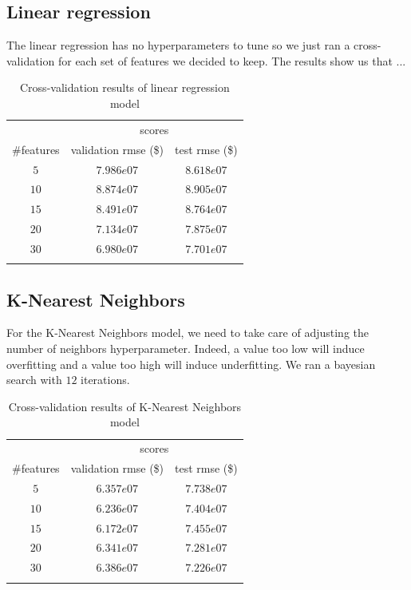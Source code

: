 \subsection{Linear regression}

The linear regression has no hyperparameters to tune so we just ran a cross-validation for each set of features we decided to keep. The results show us that ... 

\begin{table}[H]
	\centering
	\begin{tabular}{ccc} \toprule
	  & \multicolumn {2}{c}{scores} \\\cmidrule(lr) {2-3}
	  \#features         & validation rmse (\$)             & test rmse (\$) \\\hline
	  $5$        		& $7.986e07$                      	& $8.618e07$ \\
	  $10$        		& $8.874e07$                        & $8.905e07$ \\
	  $15$        		& $8.491e07$                        & $8.764e07$ \\
	  $20$             	& $7.134e07$                        & $7.875e07$ \\
	  $30$             	& $6.980e07$                        & $7.701e07$ \\
	  \\\hline
	\end{tabular}
	\caption{Cross-validation results of linear regression model}
	\label{tab:linear-regression-results}
\end{table}

\subsection{K-Nearest Neighbors}

For the K-Nearest Neighbors model, we need to take care of adjusting the number of neighbors hyperparameter. Indeed, a value too low will induce overfitting and a value too high will induce underfitting. We ran a bayesian search with $12$ iterations.

\begin{table}[H]
	\centering
	\begin{tabular}{ccc} \toprule
	  & \multicolumn {2}{c}{scores} \\\cmidrule(lr) {2-3}
	  \#features         & validation rmse (\$)             & test rmse (\$) \\\hline
	  $5$        		& $6.357e07$                      	& $7.738e07$ \\
	  $10$        		& $6.236e07$                        & $7.404e07$ \\
	  $15$        		& $6.172e07$                        & $7.455e07$ \\
	  $20$             	& $6.341e07$                        & $7.281e07$ \\
	  $30$             	& $6.386e07$                        & $7.226e07$ \\
	  \\\hline
	\end{tabular}
	\caption{Cross-validation results of K-Nearest Neighbors model}
	\label{tab:knn-results}
\end{table}

